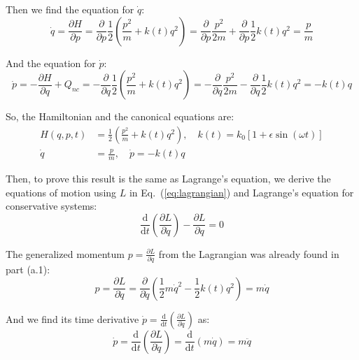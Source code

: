 \documentclass[titlepage]{article}
\begin{document}
Then we find the equation for $\dot{q}$:
\begin{equation}
	\dot{q}=\frac{\partial H}{\partial p}=\frac{\partial}{\partial p}\frac{1}{2}\left(\frac{p^2}{m}+k(t)q^2\right)=\frac{\partial}{\partial p}\frac{p^2}{2m}+\frac{\partial}{\partial p}\frac{1}{2}k(t)q^2=\frac{p}{m}
\end{equation}

And the equation for $\dot{p}$:
\begin{equation}
	\dot{p}=-\frac{\partial H}{\partial q}+Q_{nc}=-\frac{\partial}{\partial q}\frac{1}{2}\left(\frac{p^2}{m}+k(t)q^2\right)=-\frac{\partial}{\partial q}\frac{p^2}{2m}-\frac{\partial}{\partial q}\frac{1}{2}k(t)q^2=-k(t)q
\end{equation}

\begin{mdframed}[linewidth=1pt, innertopmargin=10pt, innerbottommargin=10pt]
	So, the Hamiltonian and the canonical equations are:
	\begin{equation}
		\begin{split}
			H(q,p,t)&=\frac{1}{2}\left(\frac{p^2}{m}+k(t)q^2\right),\quad k(t)=k_0\left[1+\epsilon\sin\left(\omega t\right)\right] \\
			\dot{q}&=\frac{p}{m},\quad\dot{p}=-k(t)q
		\end{split}
	\end{equation}
\end{mdframed}

Then, to prove this result is the same as Lagrange's equation, we derive the equations of motion using $L$ in Eq.~(\ref{eq:lagrangian}) and Lagrange's equation for conservative systems:
\begin{equation}
	\frac{\mathrm{d}}{\mathrm{d}t}\left(\frac{\partial L}{\partial\dot{q}}\right)-\frac{\partial L}{\partial q}=0
\end{equation}

The generalized momentum $p=\frac{\partial L}{\partial\dot{q}}$ from the Lagrangian was already found in part (a.1):
\begin{equation}
	p=\frac{\partial L}{\partial\dot{q}}=\frac{\partial}{\partial\dot{q}}\left(\frac{1}{2}m\dot{q}^2-\frac{1}{2}k(t)q^2\right)=m\dot{q}
\end{equation}

And we find its time derivative  $\dot{p}=\frac{\mathrm{d}}{\mathrm{d}t}\left(\frac{\partial L}{\partial\dot{q}}\right)$ as:
\begin{equation}
	\dot{p}=\frac{\mathrm{d}}{\mathrm{d}t}\left(\frac{\partial L}{\partial\dot{q}}\right)=\frac{\mathrm{d}}{\mathrm{d}t}\left(m\dot{q}\right)=m\ddot{q}
\end{equation}
\end{document}
